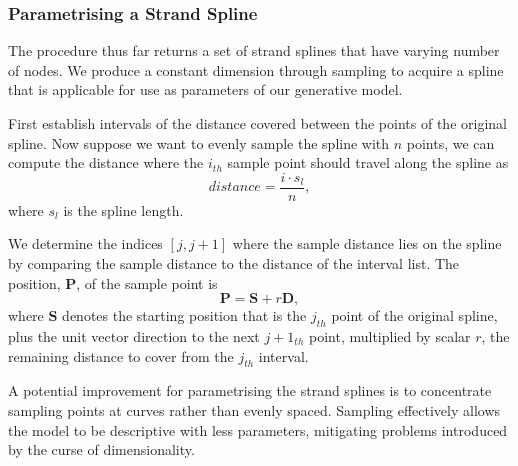 \documentclass[ %
author={Dillon Keith Diep},
supervisor={Dr. Carl Henrik Ek},
degree={MEng},
title={ART-CG:},
subtitle={Assisted Real-time Content Generation of 3D Hair by Learning Manifolds},
type={Research},
year={2017} ]{dissertation}
\begin{document}
\subsubsection{Parametrising a Strand Spline}
The procedure thus far returns a set of strand splines that have varying number of nodes. We produce a constant dimension through sampling to acquire a spline that is applicable for use as parameters of our generative model.

First establish intervals of the distance covered between the points of the original spline. Now suppose we want to evenly sample the spline with $n$ points, we can compute the distance where the $i_{th}$ sample point should travel along the spline as
$$distance=\frac{i \cdot s_l}{n},$$
where $s_l$ is the spline length.

We determine the indices $[j, j+1]$ where the sample distance lies on the spline by comparing the sample distance to the distance of the interval list. The position, $\bm{P}$, of the sample point is
$$\bm{P} = \bm{S} + r\bm{D},$$
where $\bm{S}$ denotes the starting position that is the $j_{th}$ point of the original spline, plus the unit vector direction to the next $j+1_{th}$ point, multiplied by scalar $r$, the remaining distance to cover from the $j_{th}$ interval.

A potential improvement for parametrising the strand splines is to concentrate sampling points at curves rather than evenly spaced. Sampling effectively allows the model to be descriptive with less parameters, mitigating problems introduced by the curse of dimensionality.
\end{document}
